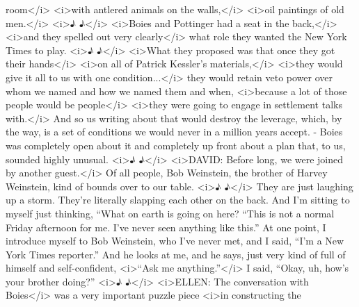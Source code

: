 \begin{itemize}
\begin{itemize}
    room\textless{}/i\textgreater{} \textless{}i\textgreater{}with
    antlered animals on the walls,\textless{}/i\textgreater{}
    \textless{}i\textgreater{}oil paintings of old
    men.\textless{}/i\textgreater{} \textless{}i\textgreater{}♪
    ♪\textless{}/i\textgreater{} \textless{}i\textgreater{}Boies and
    Pottinger had a seat in the back,\textless{}/i\textgreater{}
    \textless{}i\textgreater{}and they spelled out very
    clearly\textless{}/i\textgreater{} what role they wanted the New
    York Times to play. \textless{}i\textgreater{}♪
    ♪\textless{}/i\textgreater{} \textless{}i\textgreater{}What they
    proposed was that once they got their
    hands\textless{}/i\textgreater{} \textless{}i\textgreater{}on all of
    Patrick Kessler's materials,\textless{}/i\textgreater{}
    \textless{}i\textgreater{}they would give it all to us with one
    condition...\textless{}/i\textgreater{} they would retain veto power
    over whom we named and how we named them and when,
    \textless{}i\textgreater{}because a lot of those people would be
    people\textless{}/i\textgreater{} \textless{}i\textgreater{}they
    were going to engage in settlement talks
    with.\textless{}/i\textgreater{} And so us writing about that would
    destroy the leverage, which, by the way, is a set of conditions we
    would never in a million years accept. - Boies was completely open
    about it and completely up front about a plan that, to us, sounded
    highly unusual. \textless{}i\textgreater{}♪
    ♪\textless{}/i\textgreater{} \textless{}i\textgreater{}DAVID: Before
    long, we were joined by another guest.\textless{}/i\textgreater{} Of
    all people, Bob Weinstein, the brother of Harvey Weinstein, kind of
    bounds over to our table. \textless{}i\textgreater{}♪
    ♪\textless{}/i\textgreater{} They are just laughing up a storm.
    They're literally slapping each other on the back. And I'm sitting
    to myself just thinking, ``What on earth is going on here? ``This is
    not a normal Friday afternoon for me. I've never seen anything like
    this.'' At one point, I introduce myself to Bob Weinstein, who I've
    never met, and I said, ``I'm a New York Times reporter.'' And he
    looks at me, and he says, just very kind of full of himself and
    self-confident, \textless{}i\textgreater{}``Ask me
    anything.''\textless{}/i\textgreater{} I said, ``Okay, uh, how's
    your brother doing?'' \textless{}i\textgreater{}♪
    ♪\textless{}/i\textgreater{} \textless{}i\textgreater{}ELLEN: The
    conversation with Boies\textless{}/i\textgreater{} was a very
    important puzzle piece \textless{}i\textgreater{}in constructing the

\end{itemize}
\end{itemize}
